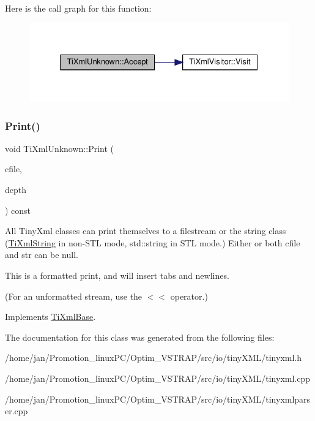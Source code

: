 Here is the call graph for this function\+:
\nopagebreak
\begin{figure}[H]
\begin{center}
\leavevmode
\includegraphics[width=331pt]{classTiXmlUnknown_aafdf1b2d4f561979c7907bad91004999_cgraph}
\end{center}
\end{figure}
\mbox{\label{classTiXmlUnknown_a5793fbc48ab3419783c0e866ca2d334e}} 
\subsubsection{\texorpdfstring{Print()}{Print()}}
{\footnotesize\ttfamily void Ti\+Xml\+Unknown\+::\+Print (\begin{DoxyParamCaption}\item[{F\+I\+LE $\ast$}]{cfile,  }\item[{int}]{depth }\end{DoxyParamCaption}) const\hspace{0.3cm}{\ttfamily [virtual]}}

All Tiny\+Xml classes can print themselves to a filestream or the string class (\hyperlink{classTiXmlString}{Ti\+Xml\+String} in non-\/\+S\+TL mode, std\+::string in S\+TL mode.) Either or both cfile and str can be null.

This is a formatted print, and will insert tabs and newlines.

(For an unformatted stream, use the $<$$<$ operator.) 

Implements \hyperlink{classTiXmlBase_a0de56b3f2ef14c65091a3b916437b512}{Ti\+Xml\+Base}.



The documentation for this class was generated from the following files\+:\begin{DoxyCompactItemize}
\item 
/home/jan/\+Promotion\+\_\+linux\+P\+C/\+Optim\+\_\+\+V\+S\+T\+R\+A\+P/src/io/tiny\+X\+M\+L/tinyxml.\+h\item 
/home/jan/\+Promotion\+\_\+linux\+P\+C/\+Optim\+\_\+\+V\+S\+T\+R\+A\+P/src/io/tiny\+X\+M\+L/tinyxml.\+cpp\item 
/home/jan/\+Promotion\+\_\+linux\+P\+C/\+Optim\+\_\+\+V\+S\+T\+R\+A\+P/src/io/tiny\+X\+M\+L/tinyxmlparser.\+cpp\end{DoxyCompactItemize}
